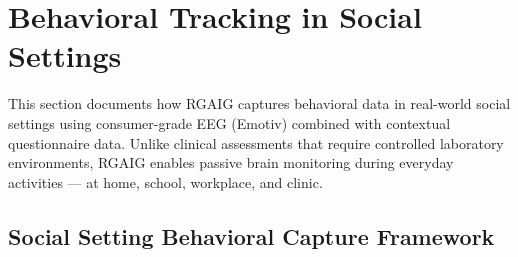 
\normalsize\normalfont\color{black}

\section{Behavioral Tracking in Social Settings}
\label{sec:behavioral_tracking}

This section documents how RGAIG captures behavioral data in real-world social settings using consumer-grade EEG (Emotiv) combined with contextual questionnaire data. Unlike clinical assessments that require controlled laboratory environments, RGAIG enables passive brain monitoring during everyday activities --- at home, school, workplace, and clinic.

\subsection{Social Setting Behavioral Capture Framework}

